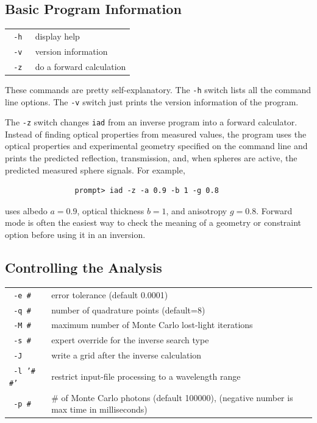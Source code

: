 \documentclass{article}
\newcommand\iadprog{\texttt{iad}}
\begin{document}
\subsection{Basic Program Information}

\begin{center}
\begin{tabular}{lp{7cm}}
\texttt{ -h                  }& display help              \\
\texttt{ -v                  }& version information                        \\
\texttt{ -z                  }& do a forward calculation                   \\
\end{tabular}
\end{center}

These commands are pretty self-explanatory.  The \texttt{-h} switch lists all the
command line options.  The \texttt{-v} switch just prints the version information
of the program.

The \texttt{-z} switch changes \iadprog{} from an inverse program into a
forward calculator.  Instead of finding optical properties from measured
values, the program uses the optical properties and experimental geometry
specified on the command line and prints the predicted reflection,
transmission, and, when spheres are active, the predicted measured sphere
signals.  For example,
\begin{verbatim}
                prompt> iad -z -a 0.9 -b 1 -g 0.8
\end{verbatim}
uses albedo $a=0.9$, optical thickness $b=1$, and anisotropy $g=0.8$.
Forward mode is often the easiest way to check the meaning of a geometry or
constraint option before using it in an inversion.

\subsection{Controlling the Analysis}

\begin{center}
\begin{tabular}{lp{7cm}}
\texttt{ -e \#               }& error tolerance (default 0.0001)           \\
\texttt{ -q \#               }& number of quadrature points (default=8)    \\
\texttt{ -M \#               }& maximum number of Monte Carlo lost-light iterations \\
\texttt{ -s \#               }& expert override for the inverse search type \\
\texttt{ -J                  }& write a grid after the inverse calculation \\
\texttt{ -l '\# \#'          }& restrict input-file processing to a wavelength range \\
\texttt{ -p \#               }& \# of Monte Carlo photons (default 100000),
                              (negative number is max time in milliseconds)\\[3mm]
\end{tabular}
\end{center}
\end{document}
